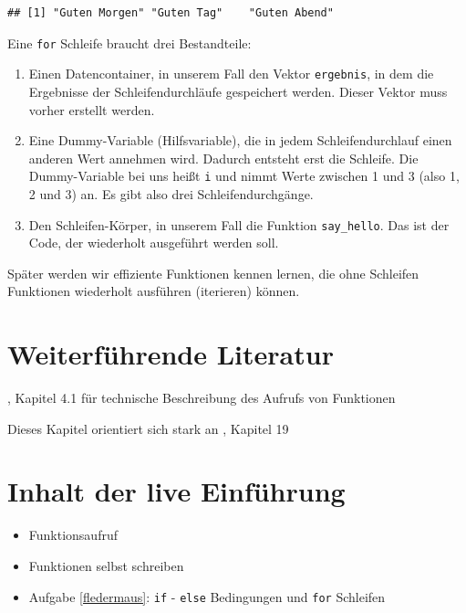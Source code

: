 \documentclass[]{book}
\providecommand{\tightlist}{%
  \setlength{\itemsep}{0pt}\setlength{\parskip}{0pt}}
\begin{document}
\begin{verbatim}
## [1] "Guten Morgen" "Guten Tag"    "Guten Abend"
\end{verbatim}

Eine \texttt{for} Schleife braucht drei Bestandteile:

\begin{enumerate}
\def\labelenumi{\arabic{enumi}.}
\tightlist
\item
  Einen Datencontainer, in unserem Fall den Vektor \texttt{ergebnis}, in dem die Ergebnisse der Schleifendurchläufe gespeichert werden. Dieser Vektor muss vorher erstellt werden.
\item
  Eine Dummy-Variable (Hilfsvariable), die in jedem Schleifendurchlauf einen anderen Wert annehmen wird. Dadurch entsteht erst die Schleife. Die Dummy-Variable bei uns heißt \texttt{i} und nimmt Werte zwischen 1 und 3 (also 1, 2 und 3) an. Es gibt also drei Schleifendurchgänge.
\item
  Den Schleifen-Körper, in unserem Fall die Funktion \texttt{say\_hello}. Das ist der Code, der wiederholt ausgeführt werden soll.
\end{enumerate}

Später werden wir effiziente Funktionen kennen lernen, die ohne Schleifen Funktionen wiederholt ausführen (iterieren) können.

\hypertarget{weiterfuxfchrende-literatur}{%
\section{Weiterführende Literatur}\label{weiterfuxfchrende-literatur}}

\citet{Ligges2008}, Kapitel 4.1 für technische Beschreibung des Aufrufs von Funktionen

Dieses Kapitel orientiert sich stark an \citet{Wickham2017}, Kapitel 19

\hypertarget{inhalt-der-live-einfuxfchrung-4}{%
\section{Inhalt der live Einführung}\label{inhalt-der-live-einfuxfchrung-4}}

\begin{itemize}
\tightlist
\item
  Funktionsaufruf
\item
  Funktionen selbst schreiben
\item
  Aufgabe \ref{fledermaus}: \texttt{if} - \texttt{else} Bedingungen und \texttt{for} Schleifen
\end{itemize}
\end{document}
